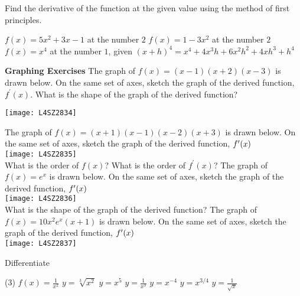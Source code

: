 \begin{Exercise}[title={Differentiation from First Principles}, label=exFirstPrinciples]
	\Question Find the derivative of the function at the given value using the method of first principles.
	\begin{tasks}
		\task $f (x) =5 x^{2} +3 x -1$ at the number $2$%
		\task $f (x) =1 -3 x^{2}$ at the number $2$%
		\task $f (x) =x^{4}$ at the number $1$, given $(x +h)^{4} =x^{4} +4 x^{3} h +6 x^{2} h^{2} +4 x h^{3} +h^{4}$%
	\end{tasks}

{\hspace{-0.6cm}\textbf{Graphing Exercises}}	
\Question The graph of $f (x) =(x -1) (x +2) (x -3)$ is drawn below. On the same set of axes, sketch the graph of the derived function, $f^{ \prime } (x)$. What is the shape of the graph of the derived function?\\
\begin{center}
\texttt{[image: L4SZ2834]}
\end{center}

\Question The graph of $f (x) =(x +1) (x -1) (x -2) (x +3)$ is drawn below. On the same set of axes, sketch the graph of the derived function, $f^{ \prime } (x)\vspace{+0.500000cm}$ \\
\texttt{[image: L4SZ2835]}\\
What is the order of $f (x)$? What is the order of $f^{ \prime } (x)$?%
\Question The graph of $f (x) =e^{x}$ is drawn below. On the same set of axes, sketch the graph of the derived function, $f^{ \prime } (x)\vspace{+0.500000cm}$ \\
\texttt{[image: L4SZ2836]}\\
What is the shape of the graph of the derived function?	
\Question The graph of $f (x) =10 x^{2} e^{x} (x +1)$ is drawn below. On the same set of axes, sketch the graph of the derived function, $f^{ \prime } (x)\vspace{+0.500000cm}$ \\
\texttt{[image: L4SZ2837]}%

	\Question Differentiate
\begin{tasks}(3)
	\task  $f (x) =\frac{1}{x^{2}}$ %
	\task $y =\sqrt[{3}]{x^{2}}$ %
	\task $y =x^{5}$ %
	\task $y =\frac{1}{x^{3}}$ %
	\task $y =x^{ -4}$ %
	\task $y =x^{3/4}$ %
	\task $y =\frac{1}{\sqrt{x}}$ %
\end{tasks}
\end{Exercise}
